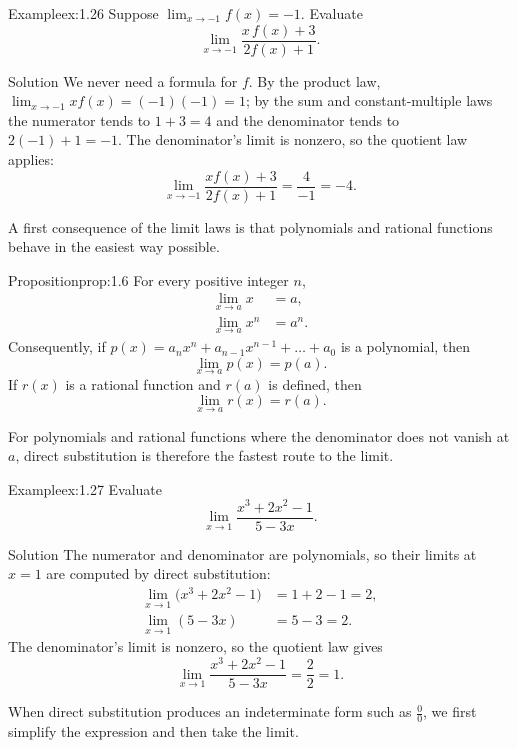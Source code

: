 \documentclass[a4paper,12pt,oneside]{memoir}
\begin{document}
\begin{workedexample}
\begin{envexample}{Example}{ex:1.26}{}
Suppose \(\lim_{x \to -1} f(x) = -1\). Evaluate \[ \lim_{x \to -1} \frac{x\,f(x) + 3}{2 f(x) + 1}. \]
\end{envexample}
\begin{envsolution}{Solution}{}{}
We never need a formula for \(f\). By the product law, \(\lim_{x \to -1} x f(x) = (-1)(-1) = 1\); by the sum and constant-multiple laws the numerator tends to \(1 + 3 = 4\) and the denominator tends to \(2(-1) + 1 = -1\). The denominator’s limit is nonzero, so the quotient law applies: \[ \lim_{x \to -1} \frac{x f(x) + 3}{2 f(x) + 1} = \frac{4}{-1} = -4. \]
\end{envsolution}
\end{workedexample}
A first consequence of the limit laws is that polynomials and rational functions behave in the easiest way possible.

\begin{envproposition}{Proposition}{prop:1.6}{}
For every positive integer \(n\), \[ \begin{aligned} \lim_{x \to a} x &= a,\\ \lim_{x \to a} x^{n} &= a^{n}. \end{aligned} \] Consequently, if \(p(x) = a_{n} x^{n} + a_{n-1} x^{n - 1} + \dots + a_{0}\) is a polynomial, then \[ \lim_{x \to a} p(x) = p(a). \] If \(r(x)\) is a rational function and \(r(a)\) is defined, then \[ \lim_{x \to a} r(x) = r(a). \]
\end{envproposition}
For polynomials and rational functions where the denominator does not vanish at \(a\), direct substitution is therefore the fastest route to the limit.

\begin{workedexample}
\begin{envexample}{Example}{ex:1.27}{}
Evaluate \[ \lim_{x \to 1} \frac{x^{3} + 2x^{2} - 1}{5 - 3x}. \]
\end{envexample}
\begin{envsolution}{Solution}{}{}
The numerator and denominator are polynomials, so their limits at \(x = 1\) are computed by direct substitution: \[ \begin{aligned} \lim_{x \to 1}\bigl(x^{3} + 2x^{2} - 1\bigr) &= 1 + 2 - 1 = 2,\\ \lim_{x \to 1}(5 - 3x) &= 5 - 3 = 2. \end{aligned} \] The denominator’s limit is nonzero, so the quotient law gives \[ \lim_{x \to 1} \frac{x^{3} + 2x^{2} - 1}{5 - 3x} = \frac{2}{2} = 1. \]
\end{envsolution}
\end{workedexample}
When direct substitution produces an indeterminate form such as \(\tfrac{0}{0}\), we first simplify the expression and then take the limit.
\end{document}
